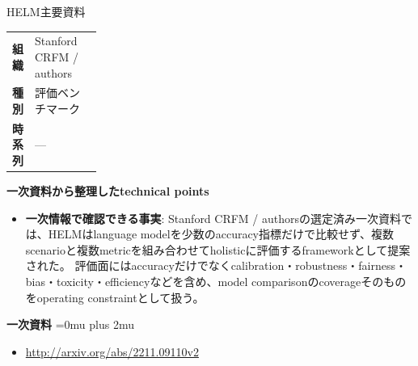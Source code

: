 \begin{technicalnote}{HELM}{主要資料}
\begingroup
\begin{tabularx}{\linewidth}{@{}>{\bfseries}p{0.22\linewidth}X@{}}
組織 & Stanford CRFM / authors \\
種別 & 評価ベンチマーク \\
時系列 & — \\
\end{tabularx}
\smallskip
{\bfseries 一次資料から整理したtechnical points}
\begin{itemize}[leftmargin=1.5em,itemsep=0.35em]
\item \textbf{一次情報で確認できる事実}: Stanford CRFM / authorsの選定済み一次資料では、HELMはlanguage modelを少数のaccuracy指標だけで比較せず、複数scenarioと複数metricを組み合わせてholisticに評価するframeworkとして提案された。 評価面にはaccuracyだけでなくcalibration・robustness・fairness・bias・toxicity・efficiencyなどを含め、model comparisonのcoverageそのものをoperating constraintとして扱う。
\end{itemize}
\begin{minipage}{\linewidth}
\begin{samepage}
{\bfseries 一次資料}
\begingroup\sloppy
\Urlmuskip=0mu plus 2mu\relax
\begin{itemize}[leftmargin=1.5em,itemsep=0.25em]
\item {\scriptsize\url{http://arxiv.org/abs/2211.09110v2}}
\end{itemize}
\endgroup
\end{samepage}
\end{minipage}
\endgroup
\end{technicalnote}
\medskip

